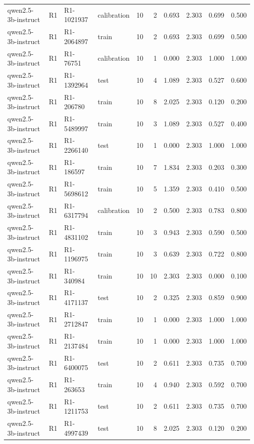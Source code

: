 \begin{table}
\begin{tabular}{llllrrrrrr}
qwen2.5-3b-instruct & R1 & R1-1021937 & calibration & 10 & 2 & 0.693 & 2.303 & 0.699 & 0.500 \\
qwen2.5-3b-instruct & R1 & R1-2064897 & train & 10 & 2 & 0.693 & 2.303 & 0.699 & 0.500 \\
qwen2.5-3b-instruct & R1 & R1-76751 & calibration & 10 & 1 & 0.000 & 2.303 & 1.000 & 1.000 \\
qwen2.5-3b-instruct & R1 & R1-1392964 & test & 10 & 4 & 1.089 & 2.303 & 0.527 & 0.600 \\
qwen2.5-3b-instruct & R1 & R1-206780 & train & 10 & 8 & 2.025 & 2.303 & 0.120 & 0.200 \\
qwen2.5-3b-instruct & R1 & R1-5489997 & train & 10 & 3 & 1.089 & 2.303 & 0.527 & 0.400 \\
qwen2.5-3b-instruct & R1 & R1-2266140 & test & 10 & 1 & 0.000 & 2.303 & 1.000 & 1.000 \\
qwen2.5-3b-instruct & R1 & R1-186597 & train & 10 & 7 & 1.834 & 2.303 & 0.203 & 0.300 \\
qwen2.5-3b-instruct & R1 & R1-5698612 & train & 10 & 5 & 1.359 & 2.303 & 0.410 & 0.500 \\
qwen2.5-3b-instruct & R1 & R1-6317794 & calibration & 10 & 2 & 0.500 & 2.303 & 0.783 & 0.800 \\
qwen2.5-3b-instruct & R1 & R1-4831102 & train & 10 & 3 & 0.943 & 2.303 & 0.590 & 0.500 \\
qwen2.5-3b-instruct & R1 & R1-1196975 & train & 10 & 3 & 0.639 & 2.303 & 0.722 & 0.800 \\
qwen2.5-3b-instruct & R1 & R1-340984 & train & 10 & 10 & 2.303 & 2.303 & 0.000 & 0.100 \\
qwen2.5-3b-instruct & R1 & R1-4171137 & test & 10 & 2 & 0.325 & 2.303 & 0.859 & 0.900 \\
qwen2.5-3b-instruct & R1 & R1-2712847 & train & 10 & 1 & 0.000 & 2.303 & 1.000 & 1.000 \\
qwen2.5-3b-instruct & R1 & R1-2137484 & train & 10 & 1 & 0.000 & 2.303 & 1.000 & 1.000 \\
qwen2.5-3b-instruct & R1 & R1-6400075 & test & 10 & 2 & 0.611 & 2.303 & 0.735 & 0.700 \\
qwen2.5-3b-instruct & R1 & R1-263653 & train & 10 & 4 & 0.940 & 2.303 & 0.592 & 0.700 \\
qwen2.5-3b-instruct & R1 & R1-1211753 & test & 10 & 2 & 0.611 & 2.303 & 0.735 & 0.700 \\
qwen2.5-3b-instruct & R1 & R1-4997439 & test & 10 & 8 & 2.025 & 2.303 & 0.120 & 0.200 \\

\end{tabular}
\end{table}
